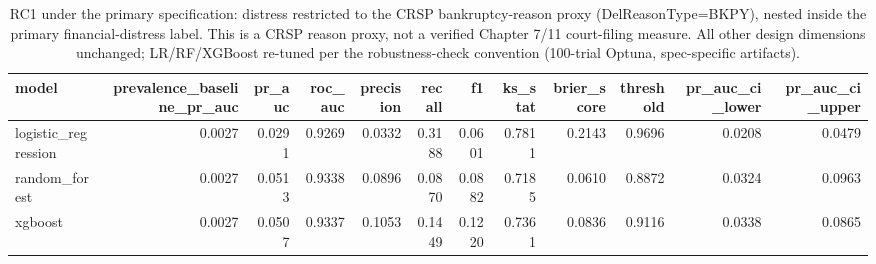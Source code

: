 \begin{table}[htbp]
\centering
\caption{RC1 under the primary specification: distress restricted to the CRSP bankruptcy-reason proxy (DelReasonType=BKPY), nested inside the primary financial-distress label. This is a CRSP reason proxy, not a verified Chapter 7/11 court-filing measure. All other design dimensions unchanged; LR/RF/XGBoost re-tuned per the robustness-check convention (100-trial Optuna, spec-specific artifacts).}
\label{tab:v2_rc1}
\small
\begin{tabular}{lrrrrrrrrrrr}
\toprule
model & prevalence\_baseline\_pr\_auc & pr\_auc & roc\_auc & precision & recall & f1 & ks\_stat & brier\_score & threshold & pr\_auc\_ci\_lower & pr\_auc\_ci\_upper \\
\midrule
logistic\_regression & 0.0027 & 0.0291 & 0.9269 & 0.0332 & 0.3188 & 0.0601 & 0.7811 & 0.2143 & 0.9696 & 0.0208 & 0.0479 \\
random\_forest & 0.0027 & 0.0513 & 0.9338 & 0.0896 & 0.0870 & 0.0882 & 0.7185 & 0.0610 & 0.8872 & 0.0324 & 0.0963 \\
xgboost & 0.0027 & 0.0507 & 0.9337 & 0.1053 & 0.1449 & 0.1220 & 0.7361 & 0.0836 & 0.9116 & 0.0338 & 0.0865 \\
\bottomrule
\end{tabular}
\end{table}
